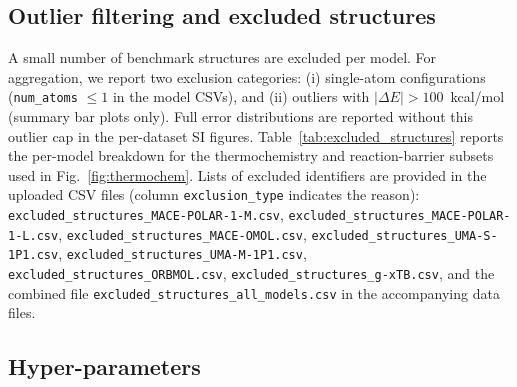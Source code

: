 \documentclass[aps,%
superscriptaddress,
 amsmath,amssymb,
floatfix,
twocolumn
]{revtex4-2}
\begin{document}
\subsection{Outlier filtering and excluded structures}
\label{sec:exclusions}
A small number of benchmark structures are excluded per model. For aggregation, we report two exclusion categories: (i) single-atom configurations (\texttt{num\_atoms} $\leq 1$ in the model CSVs), and (ii) outliers with $|\Delta E| > 100$~kcal/mol (summary bar plots only). Full error distributions are reported without this outlier cap in the per-dataset SI figures. Table~\ref{tab:excluded_structures} reports the per-model breakdown for the thermochemistry and reaction-barrier subsets used in Fig.~\ref{fig:thermochem}. Lists of excluded identifiers are provided in the uploaded CSV files (column \texttt{exclusion\_type} indicates the reason): \texttt{excluded\_structures\_MACE-POLAR-1-M.csv}, \texttt{excluded\_structures\_MACE-POLAR-1-L.csv}, \texttt{excluded\_structures\_MACE-OMOL.csv}, \texttt{excluded\_structures\_UMA-S-1P1.csv}, \texttt{excluded\_structures\_UMA-M-1P1.csv}, \texttt{excluded\_structures\_ORBMOL.csv}, \texttt{excluded\_structures\_g-xTB.csv}, and the combined file \texttt{excluded\_structures\_all\_models.csv} in the accompanying data files.


\subsection{Hyper-parameters}
\end{document}
